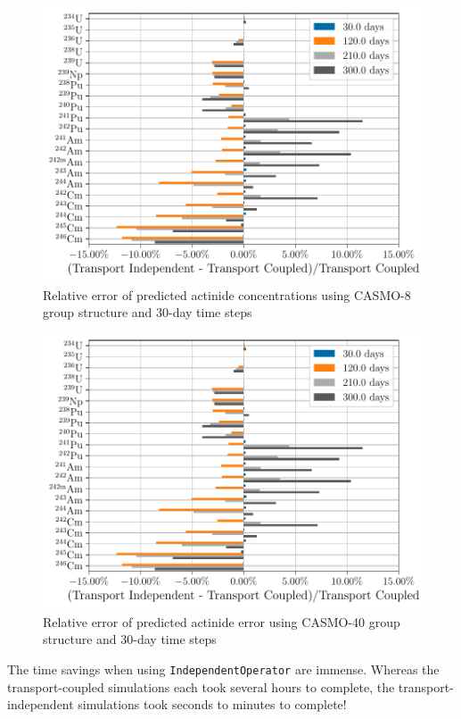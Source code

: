     \begin{figure}[h!tpb]
        \centering
        \includegraphics[width=\linewidth]{figs/actinides_casmo8_constant_xs_predictor_fission_q_months.pdf}
        \caption[]{Relative error of predicted actinide concentrations using
        CASMO-8 group structure and 30-day time steps}
        \label{fig:actinides-error-casmo8-xs-months}
    \end{figure}

    \begin{figure}[h!tpb]
        \centering
        \includegraphics[width=\linewidth]{figs/actinides_casmo40_constant_xs_predictor_fission_q_months.pdf}
        \caption{Relative error of predicted actinide error using
        CASMO-40 group structure and 30-day time steps}
        \label{fig:actinides-error-casmo40-xs-months}
    \end{figure}



    The time savings when using \verb.IndependentOperator. are immense. Whereas
    the transport-coupled simulations each took several hours to complete, the
    transport-independent simulations took seconds to minutes to complete!
